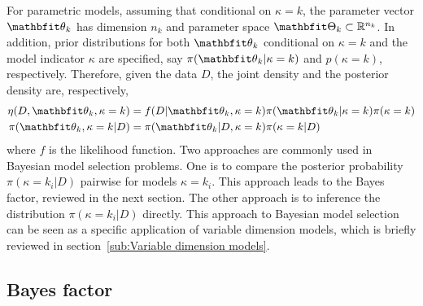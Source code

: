 \documentclass[11pt, hyper, bib, fontset=Minion]{marticle}
\begin{document}
For parametric models, assuming that conditional on $\kappa = k$, the
parameter vector $\bth_k$ has dimension $n_k$ and parameter space
$\bTh_k\subset\bbR^{n_k}$. In addition, prior distributions for both $\bth_k$
conditional on $\kappa = k$ and the model indicator $\kappa$ are specified,
say $\pi(\bth_k|\kappa =k)$ and $p(\kappa = k)$, respectively. Therefore,
given the data $D$, the joint density and the posterior density are,
respectively,
\begin{align}
  \eta(D,\bth_k,\kappa=k)
  &= f(D|\bth_k,\kappa=k)\pi(\bth_k|\kappa=k)\pi(\kappa=k)
  \label{eq:full joint}\\
  \pi(\bth_k,\kappa=k|D)
  &= \pi(\bth_k|D,\kappa=k)\pi(\kappa=k|D)
  \label{eq:full posterior}
\end{align}
where $f$ is the likelihood function. Two approaches are commonly used in
Bayesian model selection problems. One is to compare the posterior probability
$\pi(\kappa=k_i|D)$ pairwise for models $\kappa = k_i$. This approach leads to
the Bayes factor, reviewed in the next section. The other approach is to
inference the distribution $\pi(\kappa=k_i|D)$ directly. This approach to
Bayesian model selection can be seen as a specific application of variable
dimension models, which is briefly reviewed in section~\ref{sub:Variable
  dimension models}.

\subsection{Bayes factor}
\label{sub:Bayes factor}
\end{document}
